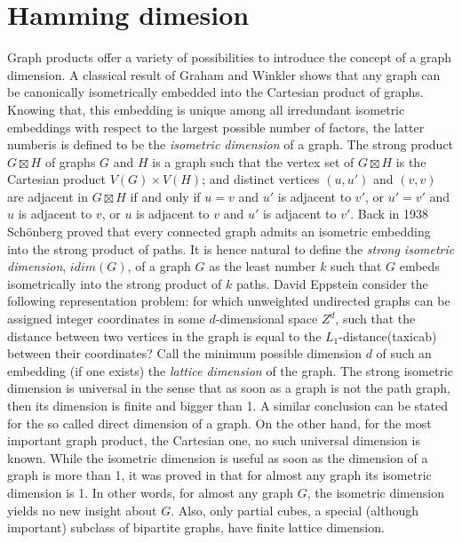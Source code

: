 \documentclass[12pt,a4paper,titlepage,openany]{report}
\begin{document}
\chapter{Hamming dimesion}\label{hdim-chapter}
Graph products offer a variety of possibilities to introduce the concept of a graph dimension. A classical result of Graham and Winkler \cite{Graham} shows that any graph can be canonically isometrically embedded into the Cartesian product of graphs. Knowing that, this embedding is unique among all irredundant isometric embeddings with respect to the largest possible number of factors, the latter numberis is defined to be the \textit{isometric dimension} of a graph. 
\newline The strong product $G\boxtimes H$ of graphs $G$ and $H$ is a graph such that the vertex set of $G\boxtimes H$ is the Cartesian product $V(G) \times V(H)$; and distinct vertices $(u,u')$ and $(v,v)$ are adjacent in $G\boxtimes  H$ if and only if $u = v$ and $u'$ is adjacent to $v'$, or $u' = v'$ and $u$ is adjacent to $v$, or $u$ is adjacent to $v$ and $u'$ is adjacent to $v'$. Back in 1938 Sch\" onberg \cite{Schonber} proved that every connected graph admits an isometric embedding into the strong product of paths. It is hence natural to define the \textit{strong isometric dimension}, $idim(G)$, of a graph $G$ as the least number $k$ such that $G$ embeds isometrically into the strong product of $k$ paths.\newline
David Eppstein consider the following representation problem: for which unweighted undirected graphs can be assigned integer coordinates in some $d$-dimensional space $Z^d$, such that the distance between two vertices in the graph is equal to the $L_1$-distance(taxicab) between their coordinates? Call the minimum possible dimension $d$ of such an embedding (if one exists) the \textit{lattice dimension} of the graph.\newline
The strong isometric dimension is universal in the sense that as soon as a graph is not the path graph, then its dimension is finite and bigger than 1. A similar conclusion can be stated for the so called direct dimension of a graph. On the other hand, for the most important graph product, the Cartesian one, no such universal dimension is known. While the isometric dimension is useful as soon as the dimension of a graph is more than 1, it was proved in \cite{Poljak} that for almost any graph its isometric dimension is 1. In
other words, for almost any graph $G$, the isometric dimension yields no new insight about $G$. Also, only
partial cubes, a special (although important) subclass of bipartite graphs, have finite lattice dimension.\newline
\end{document}
